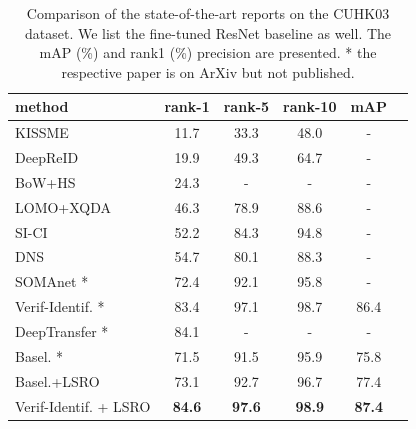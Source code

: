 \documentclass[10pt,twocolumn,letterpaper]{article}
\begin{document}
\setlength{\tabcolsep}{4pt}
\begin{table}
\begin{center}
\begin{tabular}{l|ccccc}
\hline
method & rank-1 & rank-5 & rank-10 & mAP\\
\hline
KISSME \cite{kostinger2012large} & 11.7 & 33.3 & 48.0 & -\\
DeepReID \cite{li2014deepreid} & 19.9 & 49.3 & 64.7 & -\\ 
BoW+HS \cite{zheng2015scalable} & 24.3 & - & - & -\\
LOMO+XQDA \cite{liao2015person} & 46.3 & 78.9 & 88.6 &-\\
SI-CI \cite{wang2016joint} & 52.2 & 84.3 & 94.8 &-\\
DNS \cite{zhang2016learning} & 54.7 & 80.1 & 88.3 &-\\
SOMAnet \cite{barbosa2017looking}* &72.4& 92.1 & 95.8 & - \\
Verif-Identif. \cite{zheng2016discriminatively}* & 83.4 & 97.1 & 98.7 & 86.4\\
DeepTransfer \cite{geng2016deep}* & 84.1& - & - & - \\
\hline
Basel. \cite{zheng2016survey,zheng2016discriminatively}* & 71.5 & 91.5 & 95.9 & 75.8\\ 
Basel.+LSRO & 73.1 & 92.7 & 96.7 & 77.4 \\
Verif-Identif. + LSRO & \textbf{84.6} & \textbf{97.6} & \textbf{98.9} & \textbf{87.4}\\
\hline
\end{tabular}
\end{center}
\caption{Comparison of the state-of-the-art reports on the CUHK03 dataset. We list the fine-tuned ResNet baseline as well. The mAP (\%) and rank1 (\%) precision are presented. * the respective paper is on ArXiv but not published.}
\label{table:CUHK03}
\end{table}
\end{document}
